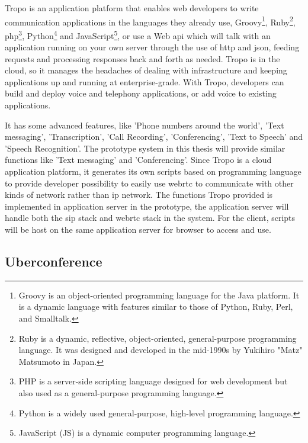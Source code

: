 \par Tropo is an application platform that enables web developers to write communication applications in the languages they already use, Groovy\footnote{Groovy is an object-oriented programming language for the Java platform. It is a dynamic language with features similar to those of Python, Ruby, Perl, and Smalltalk.\cite{wiki:groovy}}, Ruby\footnote{Ruby is a dynamic, reflective, object-oriented, general-purpose programming language. It was designed and developed in the mid-1990s by Yukihiro "Matz" Matsumoto in Japan.\cite{wiki:ruby}}, \gls{php}\footnote{PHP is a server-side scripting language designed for web development but also used as a general-purpose programming language.\cite{wiki:php}}, Python\footnote{Python is a widely used general-purpose, high-level programming language.\cite{wiki:python}} and JavaScript\footnote{JavaScript (JS) is a dynamic computer programming language.\cite{wiki:js}}, or use a Web \gls{api} which will talk with an application running on your own server through the use of \gls{http} and \gls{json}, feeding requests and processing responses back and forth as needed. Tropo is in the cloud, so it manages the headaches of dealing with infrastructure and keeping applications up and running at enterprise-grade. With Tropo, developers can build and deploy voice and telephony applications, or add voice to existing applications.\cite{web:tropo}

\par It has some advanced features, like 'Phone numbers around the world', 'Text messaging', 'Transcription', 'Call Recording', 'Conferencing', 'Text to Speech' and 'Speech Recognition'. The prototype system in this thesis will provide similar functions like 'Text messaging' and 'Conferencing'. Since Tropo is a cloud application platform, it generates its own scripts based on programming language to provide developer possibility to easily use \gls{webrtc} to communicate with other kinds of network rather than \gls{ip} network. The functions Tropo provided is implemented in application server in the prototype, the application server will handle both the \gls{sip} stack and \gls{webrtc} stack in the system. For the client, scripts will be host on the same application server for browser to access and use.

\subsection{Uberconference}

